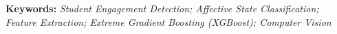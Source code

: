 



\noindent\textbf{Keywords:} \textit{
Student Engagement Detection; Affective State Classification; Feature Extraction; Extreme Gradient Boosting (XGBoost); Computer Vision
}

\clearpage
